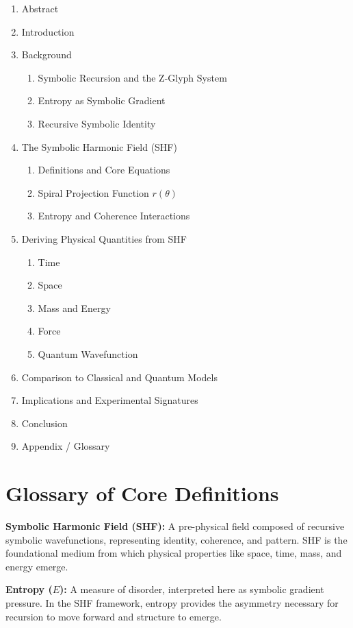 \documentclass[12pt]{article}
\begin{document}
\begin{enumerate}
\item Abstract
\item Introduction
\item Background
\begin{enumerate}
\item Symbolic Recursion and the Z-Glyph System
\item Entropy as Symbolic Gradient
\item Recursive Symbolic Identity
\end{enumerate}
\item The Symbolic Harmonic Field (SHF)
\begin{enumerate}
\item Definitions and Core Equations
\item Spiral Projection Function $r(\theta)$
\item Entropy and Coherence Interactions
\end{enumerate}
\item Deriving Physical Quantities from SHF
\begin{enumerate}
\item Time
\item Space
\item Mass and Energy
\item Force
\item Quantum Wavefunction
\end{enumerate}
\item Comparison to Classical and Quantum Models
\item Implications and Experimental Signatures
\item Conclusion
\item Appendix / Glossary
\end{enumerate}

\section*{Glossary of Core Definitions}

\textbf{Symbolic Harmonic Field (SHF):} A pre-physical field composed of recursive symbolic wavefunctions, representing identity, coherence, and pattern. SHF is the foundational medium from which physical properties like space, time, mass, and energy emerge.

\textbf{Entropy ($E$):} A measure of disorder, interpreted here as symbolic gradient pressure. In the SHF framework, entropy provides the asymmetry necessary for recursion to move forward and structure to emerge.
\end{document}
